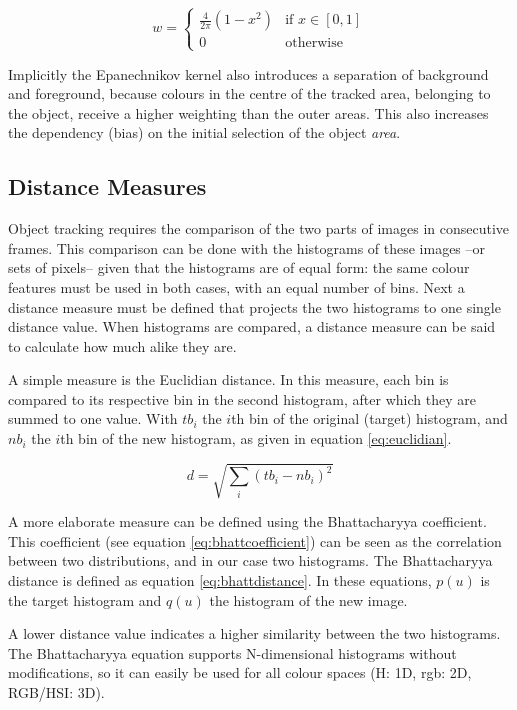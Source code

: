 \documentclass[a4paper,11pt]{article}
\begin{document}
\begin{equation}
\label{eq:epanechnikov}
w = \left\{ \begin{array}{cl}
  \frac{4}{2\pi} (1-x^2) & \textrm{if } x \in [0,1]\\
  0 & \textrm{otherwise} \end{array}\right.
\end{equation}

Implicitly the Epanechnikov kernel also introduces a separation of background and foreground, because colours in the centre of the tracked area, belonging to the object, receive a higher weighting than the outer areas.
This also increases the dependency (bias) on the initial selection of the object \emph{area}.

\subsection{Distance Measures}
\label{sec:theory:distance}
Object tracking requires the comparison of the two parts of images in consecutive frames.
This comparison can be done with the histograms of these images --or sets of pixels-- given that the histograms are of equal form: the same colour features must be used in both cases, with an equal number of bins.
Next a distance measure must be defined that projects the two histograms to one single distance value.
When histograms are compared, a distance measure can be said to calculate how much alike they are.

A simple measure is the Euclidian distance.
In this measure, each bin is compared to its respective bin in the second histogram, after which they are summed to one value.
With $tb_i$ the $i$th bin of the original (target) histogram, and $nb_i$ the $i$th bin of the new histogram, as given in equation \ref{eq:euclidian}.

\begin{equation}
\label{eq:euclidian}
d = \sqrt{\sum_i (tb_i - nb_i)^2}
\end{equation}

A more elaborate measure can be defined using the Bhattacharyya coefficient.
This coefficient (see equation \ref{eq:bhattcoefficient}) can be seen as the correlation between two distributions, and in our case two histograms.
The Bhattacharyya distance is defined as equation \ref{eq:bhattdistance}.
In these equations, $p(u)$ is the target histogram and $q(u)$ the histogram of the new image.\cite{kernelbased}

A lower distance value indicates a higher similarity between the two histograms.
The Bhattacharyya equation supports N-dimensional histograms without modifications, so it can easily be used for all colour spaces (H: 1D, rgb: 2D, RGB/HSI: 3D).
\end{document}
